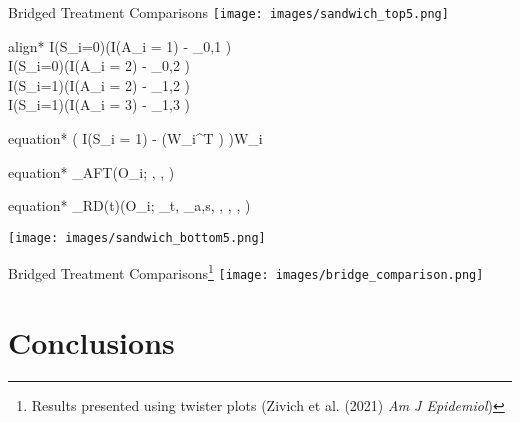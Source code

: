 \documentclass{beamer}
\begin{document}
\begin{frame}{Bridged Treatment Comparisons}
	\centering 
	\texttt{[image: images/sandwich\_top5.png]}
	\begin{empheq}[box=\bbox]{align*}
		I(S_i=0)\left(I(A_i = 1) - \hat{\gamma}_{0,1} \right) \\
		I(S_i=0)\left(I(A_i = 2) - \hat{\gamma}_{0,2} \right) \\
		I(S_i=1)\left(I(A_i = 2) - \hat{\gamma}_{1,2} \right) \\
		I(S_i=1)\left(I(A_i = 3) - \hat{\gamma}_{1,3} \right) \\
	\end{empheq}
	\begin{empheq}[box=\ybox]{equation*}
		\left( I(S_i = 1) - (W_i^T \hat{\delta}) \right)W_i
	\end{empheq}
	\begin{empheq}[box=\gbox]{equation*}
		\psi_{AFT}(O_i; \hat{\lambda}, \hat{\beta}, \hat{\alpha})
	\end{empheq}
	\begin{empheq}[box=\wbox]{equation*}
		\psi_{RD(t)}(O_i; \hat{\mu}_t, \hat{\gamma}_{a,s}, \hat{\delta}, \hat{\lambda}, \hat{\beta}, \hat{\alpha})
	\end{empheq}
	\texttt{[image: images/sandwich\_bottom5.png]}
\end{frame}

\begin{frame}{Bridged Treatment Comparisons\footnote[frame]{Results presented using twister plots (Zivich et al. (2021) \textit{Am J Epidemiol})}}
	\centering 
	\texttt{[image: images/bridge\_comparison.png]}
\end{frame}

\section{Conclusions}
\end{document}
